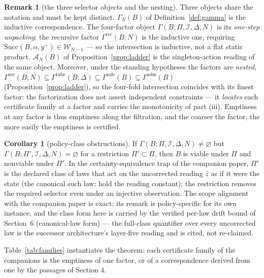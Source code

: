 \documentclass[10pt,twocolumn]{article}
\theoremstyle{definition}
\newtheorem{corollary}{Corollary}
\newtheorem{remark}{Remark}
\begin{document}
\begin{remark}[the three selector objects and the nesting]\label{rem:objects}
Three objects share the notation and must be kept distinct.
\(\Gamma_{N}(B)\) of Definition~\ref{def:gamma} is the inductive
correspondence. The four-factor object
\(\Gamma(B; \Pi, \mathcal{I}, \Delta, N)\) is its \emph{one-step
unpacking}: the recursive factor \(\Gamma^{\mathrm{rec}}(B; N)\) is the
inductive one, requiring
\(\mathrm{Succ}(B, \alpha, y^{+}) \in \mathscr{W}_{N-1}\) --- so the
intersection is inductive, not a flat static product. \(\mathcal{A}_{N}(B)\)
of Proposition~\ref{prop:ladder} is the singleton-action reading of the
same object. Moreover, under the standing hypotheses the factors are
\emph{nested},
\(\Gamma^{\mathrm{rec}}(B;N) \subseteq \Gamma^{\mathrm{tube}}(B;\Delta)
\subseteq \Gamma^{\mathrm{safe}}(B) \subseteq \Gamma^{\mathrm{adm}}(B)\)
(Proposition~\ref{prop:ladder}), so the four-fold intersection coincides
with its finest factor: the factorization does not assert independent
constraints --- it \emph{locates} each certificate family at a factor and
carries the monotonicity of part (iii). Emptiness at any factor is thus
emptiness along the filtration, and the coarser the factor, the more
easily the emptiness is certified.
\end{remark}

\begin{corollary}[policy-class obstructions]\label{cor:ce}
If \(\Gamma(B; \Pi, \mathcal{I}, \Delta, N) \neq \varnothing\) but
\(\Gamma(B; \Pi', \mathcal{I}, \Delta, N) = \varnothing\) for a restriction
\(\Pi' \subset \Pi\), then \(B\) is viable under \(\Pi\) and nonviable under
\(\Pi'\). In the certainty-equivalence trap of the companion paper,
\(\Pi'\) is the declared class of laws that act on the uncorrected
reading \(\widehat{z}\) as if it were the state (the canonical such law:
hold the reading constant); the restriction removes the required selector
even under an injective observation. The scope alignment with the
companion paper is exact: its remark is policy-specific for its own
instance, and the class form here is carried by the verified per-law
drift bound of Section~6 (canonical-law form) --- the full-class
quantifier over every uncorrected law is the successor architecture's
layer-five reading and is cited, not re-claimed.
\end{corollary}

Table~\ref{tab:families} instantiates the theorem: each certificate family
of the companions is the emptiness of one factor, or of a correspondence
derived from one by the passages of Section 4.
\end{document}

